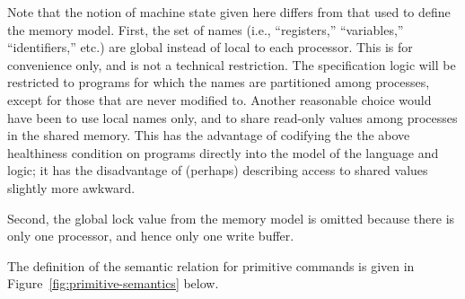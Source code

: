 \documentclass[11pt]{report}
\begin{document}
Note that the notion of machine state given here differs from that used to define the memory model. First, the set of names (i.e., ``registers,'' ``variables,'' ``identifiers,'' etc.) are global instead of local to each processor. This is for convenience only, and is not a technical restriction. The specification logic will be restricted to programs for which the names are partitioned among processes, except for those that are never modified to. Another reasonable choice would have been to use local names only, and to share read-only values among processes in the shared memory. This has the advantage of codifying the the above healthiness condition on programs directly into the model of the language and logic; it has the disadvantage of (perhaps) describing access to shared values slightly more awkward. 

Second, the global lock value from the memory model is omitted because there is only one processor, and hence only one write buffer. 

The definition of the semantic relation for primitive commands is given in Figure~\ref{fig:primitive-semantics} below. 
\end{document}
